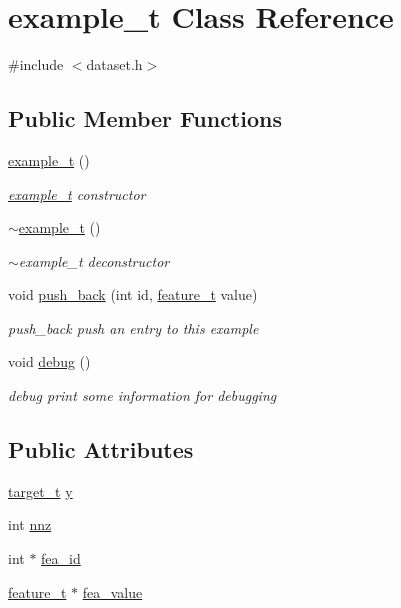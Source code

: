 \hypertarget{classexample__t}{\section{example\+\_\+t Class Reference}
\label{classexample__t}
}


{\ttfamily \#include $<$dataset.\+h$>$}

\subsection*{Public Member Functions}
\begin{DoxyCompactItemize}
\item 
\hyperlink{classexample__t_ad6ddd1b053286b14d8bb559eb9fe823e}{example\+\_\+t} ()
\begin{DoxyCompactList}\small\item\em \hyperlink{classexample__t}{example\+\_\+t} constructor \end{DoxyCompactList}\item 
\hyperlink{classexample__t_afe0ae6b57c07f297caffc89ac1d60d1c}{$\sim$example\+\_\+t} ()
\begin{DoxyCompactList}\small\item\em $\sim$example\+\_\+t deconstructor \end{DoxyCompactList}\item 
void \hyperlink{classexample__t_ad3fba8e9b56168ee3436a853c18a97a7}{push\+\_\+back} (int id, \hyperlink{dataset_8h_ac2e4791c62a663377be91b0922cede72}{feature\+\_\+t} value)
\begin{DoxyCompactList}\small\item\em push\+\_\+back push an entry to this example \end{DoxyCompactList}\item 
void \hyperlink{classexample__t_a7f7f9e6721dc7e566634c04b9d7b4303}{debug} ()
\begin{DoxyCompactList}\small\item\em debug print some information for debugging \end{DoxyCompactList}\end{DoxyCompactItemize}
\subsection*{Public Attributes}
\begin{DoxyCompactItemize}
\item 
\hyperlink{dataset_8h_a0f180d1f400ce1743488c55eb82a0a49}{target\+\_\+t} \hyperlink{classexample__t_a71bd4c6e68d5eb4543b84c47599e72bb}{y}
\item 
int \hyperlink{classexample__t_a6501a26509c4d186310a5f51c7a9ddf8}{nnz}
\item 
int $\ast$ \hyperlink{classexample__t_a48940c5caff1e78969f1e2c2e7049532}{fea\+\_\+id}
\item 
\hyperlink{dataset_8h_ac2e4791c62a663377be91b0922cede72}{feature\+\_\+t} $\ast$ \hyperlink{classexample__t_acac894d54d087a9a5f27f063003d5b72}{fea\+\_\+value}
\end{DoxyCompactItemize}


